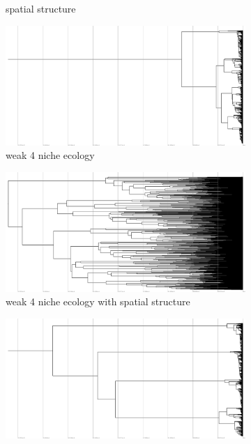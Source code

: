\begin{figure}
\begin{subfigure}[b]{0.48\textwidth}
    \caption{%
      spatial structure}
  \end{subfigure}
  \hfill
  \begin{subfigure}[b]{0.48\textwidth}
    \includegraphics[height=0.12\textheight,width=\textwidth]{img/perfect-tree-phylogenies-log/epoch=7+resolution=3+treatment=26.pdf}
    \caption{%
      weak 4 niche ecology}
  \end{subfigure}
  \hfill
  \begin{subfigure}[b]{0.48\textwidth}
      \includegraphics[height=0.12\textheight,width=\textwidth]{img/perfect-tree-phylogenies-log/epoch=7+resolution=3+treatment=24.pdf}
    \caption{%
      weak 4 niche ecology with spatial structure }
  \end{subfigure}
  \hfill
  \begin{subfigure}[b]{0.48\textwidth}
    \includegraphics[height=0.12\textheight,width=\textwidth]{img/perfect-tree-phylogenies-log/epoch=7+resolution=3+treatment=10.pdf}

\end{subfigure}
\end{figure}
